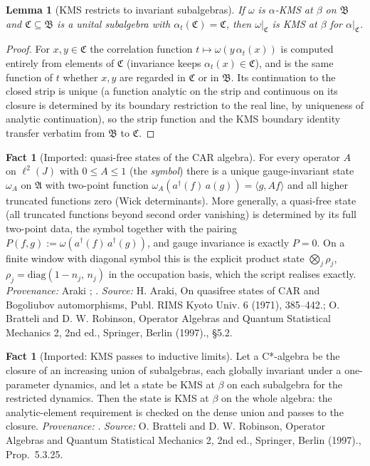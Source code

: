 \documentclass[11pt]{article}
\newtheorem{lemma}[theorem]{Lemma}
\theoremstyle{definition}
\newtheorem{fact}[theorem]{Fact}
\theoremstyle{plain}
\providecommand{\ip}{}\renewcommand{\ip}[2]{\langle #1, #2\rangle}
\begin{document}
\begin{lemma}[KMS restricts to invariant subalgebras]\label{c:hawking.kms-restricts-invariant-subalgebras}
If $\omega$ is $\alpha$-KMS at $\beta$ on $\mathfrak{B}$ and $\mathfrak{C} \subseteq \mathfrak{B}$ is a unital subalgebra with $\alpha_t(\mathfrak{C}) = \mathfrak{C}$, then $\omega|_{\mathfrak{C}}$ is KMS at $\beta$ for $\alpha|_{\mathfrak{C}}$.
\end{lemma}
\begin{proof}
For $x, y \in \mathfrak{C}$ the correlation function $t \mapsto \omega(y\,\alpha_t(x))$ is computed entirely from elements of $\mathfrak{C}$ (invariance keeps $\alpha_t(x) \in \mathfrak{C}$), and is the same function of $t$ whether $x, y$ are regarded in $\mathfrak{C}$ or in $\mathfrak{B}$. Its continuation to the closed strip is unique (a function analytic on the strip and continuous on its closure is determined by its boundary restriction to the real line, by uniqueness of analytic continuation), so the strip function and the KMS boundary identity transfer verbatim from $\mathfrak{B}$ to $\mathfrak{C}$.

\end{proof}

\begin{fact}[Imported: quasi-free states of the CAR algebra]\label{c:hawking.imported-quasi-free-states-car-algebra}
For every operator $A$ on $\ell^2(J)$ with $0 \le A \le 1$ (the \emph{symbol}) there is a unique gauge-invariant state $\omega_A$ on $\mathfrak{A}$ with two-point function $\omega_A(a^\dagger(f)\,a(g)) = \ip{g}{Af}$ and all higher truncated functions zero (Wick determinants). More generally, a quasi-free state (all truncated functions beyond second order vanishing) is determined by its full two-point data, the symbol together with the pairing $P(f, g) := \omega(a^\dagger(f)\,a^\dagger(g))$, and gauge invariance is exactly $P = 0$. On a finite window with diagonal symbol this is the explicit product state $\bigotimes_j \rho_j$, $\rho_j = \mathrm{diag}(1 - n_j,\, n_j)$ in the occupation basis, which the script realises exactly. \emph{Provenance:} Araki \cite{Araki1971}; \cite[\S 5.2]{BratteliRobinson1997}.
\emph{Source:} H. Araki, On quasifree states of CAR and Bogoliubov automorphisms, Publ. RIMS Kyoto Univ. 6 (1971), 385--442.; O. Bratteli and D. W. Robinson, Operator Algebras and Quantum Statistical Mechanics 2, 2nd ed., Springer, Berlin (1997)., \S 5.2.
\end{fact}

\begin{fact}[Imported: KMS passes to inductive limits]\label{c:hawking.imported-kms-passes-inductive-limits}
Let a C*-algebra be the closure of an increasing union of subalgebras, each globally invariant under a one-parameter dynamics, and let a state be KMS at $\beta$ on each subalgebra for the restricted dynamics. Then the state is KMS at $\beta$ on the whole algebra: the analytic-element requirement is checked on the dense union and passes to the closure. \emph{Provenance:} \cite[Prop.~5.3.25]{BratteliRobinson1997}.
\emph{Source:} O. Bratteli and D. W. Robinson, Operator Algebras and Quantum Statistical Mechanics 2, 2nd ed., Springer, Berlin (1997)., Prop.~5.3.25.
\end{fact}
\end{document}
